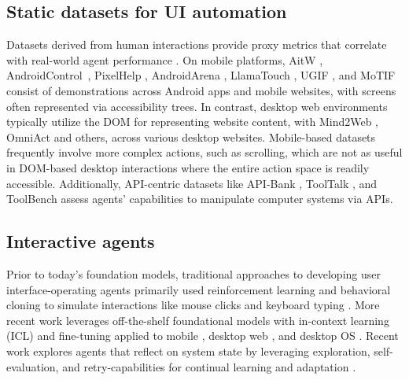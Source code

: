 \documentclass{article}
\begin{document}
\subsection{Static datasets for UI automation}

Datasets derived from human interactions provide proxy metrics that correlate with real-world agent performance \citep{li-acl20, motif, deng2023mind2web, rawles2023android}. On mobile platforms, AitW \citep{rawles2023android}, AndroidControl~\citep{li2024-android-control}, PixelHelp \citep{li-acl20}, AndroidArena \citep{android-arena}, LlamaTouch \citep{llama-touch}, UGIF \citep{ugif}, and MoTIF \citep{motif} consist of demonstrations across Android apps and mobile websites, with screens often represented via accessibility trees. In contrast, desktop web environments typically utilize the DOM for representing website content, with Mind2Web \citep{deng2023mind2web}, OmniAct \citep{kapoor2024omniact} and others, across various desktop websites. Mobile-based datasets frequently involve more complex actions, such as scrolling, which are not as useful in DOM-based desktop interactions where the entire action space is readily accessible. Additionally, API-centric datasets like API-Bank \citep{Li2023-tn}, ToolTalk \citep{farn2023tooltalk}, and ToolBench \citep{Xu2023-uw} assess agents' capabilities to manipulate computer systems via APIs.

\subsection{Interactive agents}

Prior to today's foundation models, traditional approaches to developing user interface-operating agents primarily used reinforcement learning and behavioral cloning to simulate interactions like mouse clicks and keyboard typing \citep{liu2018, li-acl20, appbuddy, gur2022environment, pmlr-v162-humphreys22a}. More recent work leverages off-the-shelf foundational models \citep{geminiteam2023gemini, openai2023gpt4, touvron2023llama} with in-context learning (ICL) and fine-tuning applied to mobile \citep{rawles2023android, hong2023cogagent, wang:chi2023, yan2023gpt4v, zhang2023look, bishop2024latent, zhang2023igniting}, desktop web \citep{zheng2023seeact, deng2023mind2web, zhou2023webarena, koh2024visualwebarena, cheng2024seeclick, lai2024autowebglm, you2024ferretuigroundedmobileui}, and desktop OS \citep{wu2024copilot, zhang2024ufo, xie2024osworld}. Recent work explores agents that reflect on system state \citep{shinn2023reflexion, Yao2022-nv, madaan2024self} by leveraging exploration, self-evaluation, and retry-capabilities for continual learning and adaptation \citep{Li2023-vo,yang2023appagent,Pan2024-kc,wu2024copilot,gao2023assistgui,murty2024bagel}.
\end{document}
